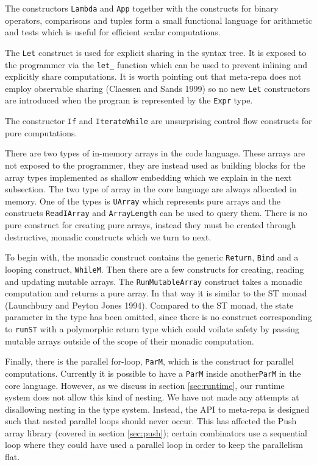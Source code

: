 \documentclass[preprint]{sigplanconf}
\begin{document}
The constructors \texttt{Lambda} and \texttt{App} together with the
constructs for binary operators, comparisons and tuples form a small
functional language for arithmetic and tests which is useful for
efficient scalar computations.

The \texttt{Let} construct is used for explicit sharing in the syntax
tree. It is exposed to the programmer via the \texttt{let\_} function
which can be used to prevent inlining and explicitly share computations.
It is worth pointing out that meta-repa does not employ observable
sharing (Claessen and Sands 1999) so no new \texttt{Let} constructors
are introduced when the program is represented by the \texttt{Expr}
type.

The constructor \texttt{If} and \texttt{IterateWhile} are unsurprising
control flow constructs for pure computations.

There are two types of in-memory arrays in the code language. These
arrays are not exposed to the programmer, they are instead used as
building blocks for the array types implemented as shallow embedding
which we explain in the next subsection. The two type of array in the
core language are always allocated in memory. One of the types is
\texttt{UArray} which represents pure arrays and the constructs
\texttt{ReadIArray} and \texttt{ArrayLength} can be used to query them.
There is no pure construct for creating pure arrays, instead they must
be created through destructive, monadic constructs which we turn to
next.

To begin with, the monadic construct contains the generic
\texttt{Return}, \texttt{Bind} and a looping construct, \texttt{WhileM}.
Then there are a few constructs for creating, reading and updating
mutable arrays. The \texttt{RunMutableArray} construct takes a monadic
computation and returns a pure array. In that way it is similar to the
ST monad (Launchbury and Peyton Jones 1994). Compared to the ST monad,
the state parameter in the type has been omitted, since there is no
construct corresponding to \texttt{runST} with a polymorphic return type
which could voilate safety by passing mutable arrays outside of the
scope of their monadic computation.

Finally, there is the parallel for-loop, \texttt{ParM}, which is the
construct for parallel computations. Currently it is possible to have a
\texttt{ParM} inside another\texttt{ParM} in the core language. However,
as we discuss in section \ref{sec:runtime}, our runtime system does not
allow this kind of nesting. We have not made any attempts at disallowing
nesting in the type system. Instead, the API to meta-repa is designed
such that nested parallel loops should never occur. This has affected
the Push array library (covered in section \ref{sec:push}); certain
combinators use a sequential loop where they could have used a parallel
loop in order to keep the parallelism flat.
\end{document}
